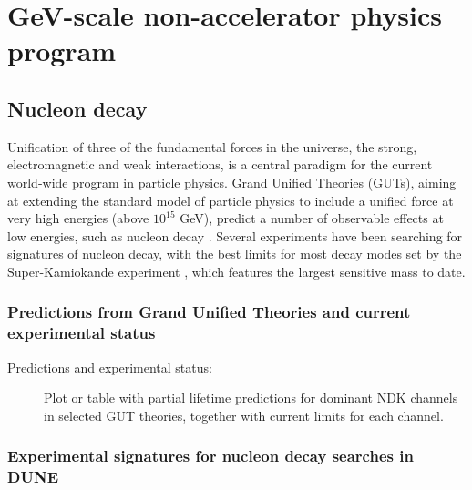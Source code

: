 \chapter{GeV-scale non-accelerator physics program}
\label{ch:nonaccel}


\section{Nucleon decay}
\label{sec:nonaccel-ndk}

Unification of three of the fundamental forces in the universe, the strong, 
electromagnetic and weak interactions, is a central paradigm for the current 
world-wide program in particle physics. Grand Unified Theories (GUTs), aiming 
at extending the standard model of particle physics to include a unified force 
at very high energies  (above $10^{15}$ GeV), predict a number of observable 
effects at low energies, such as nucleon 
decay \cite{Pati:1973rp,Georgi:1974sy,Dimopoulos:1981dw,Langacker:1980js,deBoer:1994dg,Nath:2006ut}. 
Several experiments have been searching for signatures of nucleon decay, with the best limits 
for most decay modes set by the Super-Kamiokande experiment \cite{Nishino:2012bnw}, 
which features the largest sensitive mass to date. 


\subsection{Predictions from Grand Unified Theories and current experimental status}
\label{subsec:nonaccel-ndk-status}

\begin{description}
\item[Predictions and experimental status:] Plot or table with partial lifetime predictions for dominant NDK channels in selected GUT theories, together with current limits for each channel.
\end{description}

\subsection{Experimental signatures for nucleon decay searches in DUNE}
\label{subsec:nonaccel-ndk-dune}

